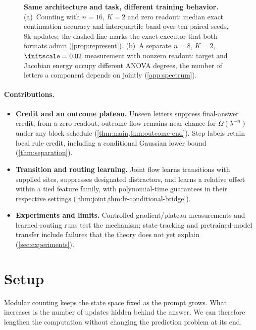 \begin{figure}[t]
\centering

\caption{\textbf{Same architecture and task, different training behavior.}
(a)~Counting with $n=16$, $K=2$ and zero readout: median exact continuation accuracy and interquartile band over ten paired seeds, $8$k
updates; the dashed line marks the exact executor that both formats admit (\cref{prop:represent}).
(b)~A separate $n=8$, $K=2$, $\initscale=0.02$ measurement with nonzero readout: target and Jacobian energy occupy different ANOVA degrees, the number of letters a component depends on jointly (\cref{app:spectrum}).}
\label{fig:overview}
\end{figure}

\paragraph{Contributions.}
\begin{itemize}[leftmargin=*,itemsep=2pt,topsep=2pt]
\item \textbf{Credit and an outcome plateau.} Unseen letters suppress final-answer credit;
from a zero readout, outcome flow remains near chance for $\Omega(\lambda^{-n})$
under any block schedule (\cref{thm:main,thm:outcome-end}). Step labels retain local rule
credit, including a conditional Gaussian lower bound (\cref{thm:separation}).
\item \textbf{Transition and routing learning.} Joint flow learns transitions with supplied
sites, suppresses designated distractors, and learns a relative offset within a tied
feature family, with polynomial-time guarantees in their respective settings
(\cref{thm:joint,thm:lr-conditional-bridge}).
\item \textbf{Experiments and limits.} Controlled gradient/plateau measurements and learned-routing
runs test the mechanism; state-tracking and pretrained-model transfer include failures
that the theory does not yet explain (\cref{sec:experiments}).
\end{itemize}

\section{Setup}
\label{sec:setup}
\label{sec:setting}

Modular counting keeps the state space fixed as the prompt grows. What increases is the number of updates hidden behind the
answer. We can therefore lengthen the computation without changing the prediction problem at its end.

